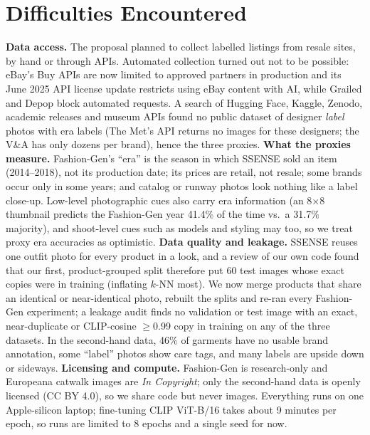 \section{Difficulties Encountered}
\label{sec:difficulties}
\textbf{Data access.} The proposal planned to collect labelled listings from resale sites, by hand or
through APIs. Automated collection turned out not to be possible: eBay's Buy APIs are now limited to
approved partners in production and its June 2025 API license update restricts using eBay content
with AI, while Grailed and Depop block automated requests. A search of Hugging Face, Kaggle, Zenodo,
academic releases and museum APIs found no public dataset of designer \emph{label} photos with era
labels (The Met's API returns no images for these designers; the V\&A has only dozens per brand),
hence the three proxies.
\textbf{What the proxies measure.} Fashion-Gen's ``era'' is the season in which SSENSE sold an item
(2014--2018), not its production date; its prices are retail, not resale; some brands occur only in
some years; and catalog or runway photos look nothing like a label close-up. Low-level photographic
cues also carry era information (an 8$\times$8 thumbnail predicts the Fashion-Gen year 41.4\% of the
time vs.\ a 31.7\% majority), and shoot-level cues such as models and styling may too, so we treat
proxy era accuracies as optimistic.
\textbf{Data quality and leakage.} SSENSE reuses one outfit photo for every product in a look, and a
review of our own code found that our first, product-grouped split therefore put 60 test images whose
exact copies were in training (inflating $k$-NN most). We now merge products that share an identical
or near-identical photo, rebuilt the splits and re-ran every Fashion-Gen experiment; a leakage audit
finds no validation or test image with an exact, near-duplicate or CLIP-cosine $\geq$0.99 copy in
training on any of the three datasets. In the second-hand data, 46\% of garments have no usable brand
annotation, some ``label'' photos show care tags, and many labels are upside down or sideways.
\textbf{Licensing and compute.} Fashion-Gen is research-only and Europeana catwalk images are
\emph{In Copyright}; only the second-hand data is openly licensed (CC BY 4.0), so we share code but
never images. Everything runs on one Apple-silicon laptop; fine-tuning CLIP ViT-B/16 takes about
9 minutes per epoch, so runs are limited to 8 epochs and a single seed for now.

